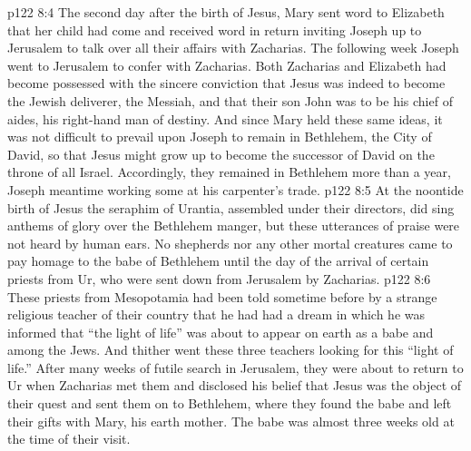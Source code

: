\vs p122 8:4 The second day after the birth of Jesus, Mary sent word to Elizabeth that her child had come and received word in return inviting Joseph up to Jerusalem to talk over all their affairs with Zacharias. The following week Joseph went to Jerusalem to confer with Zacharias. Both Zacharias and Elizabeth had become possessed with the sincere conviction that Jesus was indeed to become the Jewish deliverer, the Messiah, and that their son John was to be his chief of aides, his right\hyp{}hand man of destiny. And since Mary held these same ideas, it was not difficult to prevail upon Joseph to remain in Bethlehem, the City of David, so that Jesus might grow up to become the successor of David on the throne of all Israel. Accordingly, they remained in Bethlehem more than a year, Joseph meantime working some at his carpenter’s trade.
\vs p122 8:5 \pc At the noontide birth of Jesus the seraphim of Urantia, assembled under their directors, did sing anthems of glory over the Bethlehem manger, but these utterances of praise were not heard by human ears. No shepherds nor any other mortal creatures came to pay homage to the babe of Bethlehem until the day of the arrival of certain priests from Ur, who were sent down from Jerusalem by Zacharias.
\vs p122 8:6 These priests from Mesopotamia had been told sometime before by a strange religious teacher of their country that he had had a dream in which he was informed that “the light of life” was about to appear on earth as a babe and among the Jews. And thither went these three teachers looking for this “light of life.” After many weeks of futile search in Jerusalem, they were about to return to Ur when Zacharias met them and disclosed his belief that Jesus was the object of their quest and sent them on to Bethlehem, where they found the babe and left their gifts with Mary, his earth mother. The babe was almost three weeks old at the time of their visit.
